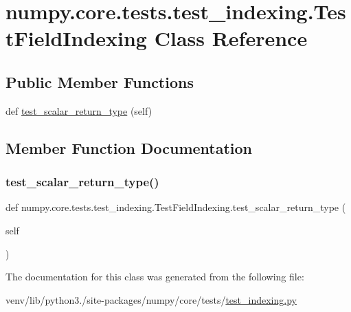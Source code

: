 \hypertarget{classnumpy_1_1core_1_1tests_1_1test__indexing_1_1TestFieldIndexing}{}\section{numpy.\+core.\+tests.\+test\+\_\+indexing.\+Test\+Field\+Indexing Class Reference}
\label{classnumpy_1_1core_1_1tests_1_1test__indexing_1_1TestFieldIndexing}
\subsection*{Public Member Functions}
\begin{DoxyCompactItemize}
\item 
def \hyperlink{classnumpy_1_1core_1_1tests_1_1test__indexing_1_1TestFieldIndexing_ad310f3ad7949f0a5951e2aba5867a399}{test\+\_\+scalar\+\_\+return\+\_\+type} (self)
\end{DoxyCompactItemize}


\subsection{Member Function Documentation}
\mbox{\label{classnumpy_1_1core_1_1tests_1_1test__indexing_1_1TestFieldIndexing_ad310f3ad7949f0a5951e2aba5867a399}} 
\subsubsection{\texorpdfstring{test\+\_\+scalar\+\_\+return\+\_\+type()}{test\_scalar\_return\_type()}}
{\footnotesize\ttfamily def numpy.\+core.\+tests.\+test\+\_\+indexing.\+Test\+Field\+Indexing.\+test\+\_\+scalar\+\_\+return\+\_\+type (\begin{DoxyParamCaption}\item[{}]{self }\end{DoxyParamCaption})}



The documentation for this class was generated from the following file\+:\begin{DoxyCompactItemize}
\item 
venv/lib/python3./site-\/packages/numpy/core/tests/\hyperlink{test__indexing_8py}{test\+\_\+indexing.\+py}\end{DoxyCompactItemize}

